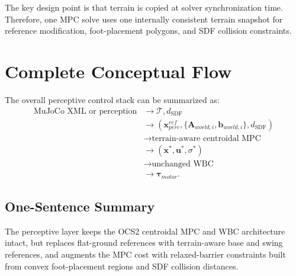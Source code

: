\documentclass[11pt,a4paper]{article}
\begin{document}
The key design point is that terrain is copied at solver synchronization time. Therefore, one MPC solve uses one internally consistent terrain snapshot for reference modification, foot-placement polygons, and SDF collision constraints.


\section{Complete Conceptual Flow}

The overall perceptive control stack can be summarized as:
\begin{equation}
	\begin{aligned}
		\text{MuJoCo XML or perception}
		&\longrightarrow
		\mathcal{T},d_{\text{SDF}}\\
		&\longrightarrow
		\left(
			\bm{x}^{ref}_{perc},
			\{\bm{A}_{world,i},\bm{b}_{world,i}\},
			d_{\text{SDF}}
		\right)\\
		&\longrightarrow
		\text{terrain-aware centroidal MPC}\\
		&\longrightarrow
		(\bm{x}^*,\bm{u}^*,\sigma^*)\\
		&\longrightarrow
		\text{unchanged WBC}\\
		&\longrightarrow
		\bm{\tau}_{motor}.
	\end{aligned}
\end{equation}

\subsection{One-Sentence Summary}

The perceptive layer keeps the OCS2 centroidal MPC and WBC architecture intact, but replaces flat-ground references with terrain-aware base and swing references, and augments the MPC cost with relaxed-barrier constraints built from convex foot-placement regions and SDF collision distances.
\end{document}
